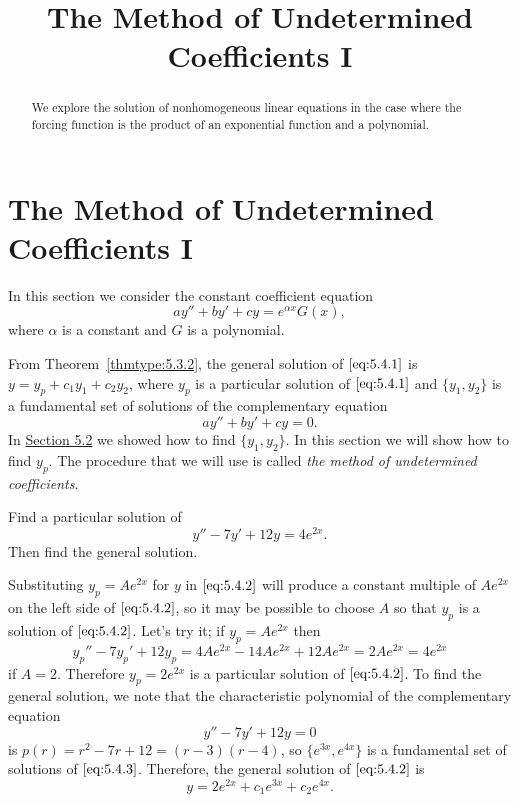 \documentclass{ximera}
\title{The Method of Undetermined Coefficients I}
\begin{document}
 
\begin{abstract}
 We explore the solution of nonhomogeneous linear equations in the case where the forcing function is the product of an exponential function and a polynomial.
\end{abstract}
 
\maketitle
 
\section*{The Method of Undetermined Coefficients I}
 
In this section we consider the constant coefficient equation
\begin{equation} \label{eq:5.4.1}
ay''+by'+cy=e^{\alpha x}G(x),
\end{equation}
where $\alpha$ is a constant and $G$ is a polynomial.
 
 
From Theorem~\ref{thmtype:5.3.2}, the general solution of $\eqref{eq:5.4.1}$
is
$y=y_p+c_1y_1+c_2y_2$, where $y_p$ is a particular solution of
$\eqref{eq:5.4.1}$ and $\{y_1,y_2\}$ is a fundamental set of
solutions of the complementary equation
$$
ay''+by'+cy=0.
$$
In \href{https://xerxes.ximera.org/differentialequations/main/constantCoefficientHomogeneousEquations/constantCoefficientHomogeneousEquations}{Section 5.2} we showed how to find $\{y_1,y_2\}$. In this
section we will show how to find $y_p$. The procedure that we will use is called \textit{the method of undetermined coefficients}.
 
 
\begin{example}\label{example:5.4.1}
Find a particular solution of
\begin{equation} \label{eq:5.4.2}
y''-7y'+12y=4e^{2x}.
\end{equation}
Then find the general solution.
 
 
\begin{explanation}
Substituting $y_p=Ae^{2x}$ for $y$ in $\eqref{eq:5.4.2}$ will produce a
constant multiple of $Ae^{2x}$ on the left side of $\eqref{eq:5.4.2}$, so it
may be possible to choose $A$ so that $y_p$ is a solution of
$\eqref{eq:5.4.2}$. Let's try it;   if $y_p=Ae^{2x}$ then
$$
y_p''-7y_p'+12y_p=4Ae^{2x}-14Ae^{2x}+12Ae^{2x}=2Ae^{2x}=4e^{2x}
$$
if $A=2$. Therefore $y_p=2e^{2x}$ is a particular solution of
$\eqref{eq:5.4.2}$. To find the general solution, we note that the
characteristic polynomial of the complementary equation
\begin{equation} \label{eq:5.4.3}
y''-7y'+12y=0
\end{equation}
is $p(r)=r^2-7r+12=(r-3)(r-4)$, so $\{e^{3x},e^{4x}\}$ is a
fundamental set of solutions of $\eqref{eq:5.4.3}$. Therefore, the general
solution of $\eqref{eq:5.4.2}$ is
$$
 y=2e^{2x}+c_1e^{3x}+c_2e^{4x}.
$$
 
\end{explanation}
\end{example}
 
\end{document}
